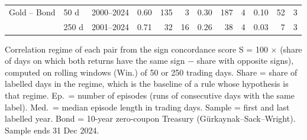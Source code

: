 \begin{table}[t]
\begin{tabular}{llcrrrrrrrrr}
Gold -- Bond & 50 d & 2000--2024 & 0.60 & 135 & 3 & 0.30 & 187 & 4 & 0.10 & 52 & 3 \\
 & 250 d & 2001--2024 & 0.71 & 32 & 16 & 0.26 & 38 & 4 & 0.03 & 7 & 3 \\
\bottomrule
\end{tabular}
\par\smallskip
\parbox{\linewidth}{\footnotesize Correlation regime of each pair from the sign concordance score S = 100 $\times$ (share of days on which both returns have the same sign $-$ share with opposite signs), computed on rolling windows (Win.) of 50 or 250 trading days. Share = share of labelled days in the regime, which is the baseline of a rule whose hypothesis is that regime. Ep.\ = number of episodes (runs of consecutive days with the same label). Med.\ = median episode length in trading days. Sample = first and last labelled year. Bond = 10-year zero-coupon Treasury (G\"urkaynak--Sack--Wright). Sample ends 31 Dec 2024.}
\end{table}
